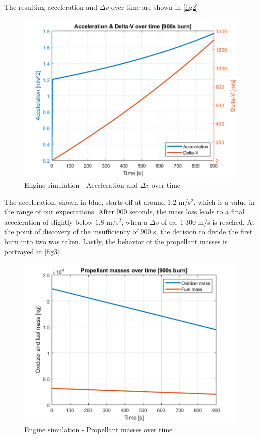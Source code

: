 The resulting acceleration and $\Delta v$ over time are shown in \autoref{fig2}.
\begin{figure}[H]
	\centering\includegraphics[width=0.9\linewidth]{accdeltav}
	\caption{Engine simulation - Acceleration and $\Delta v$ over time}\label{fig2}
\end{figure}

The acceleration, shown in blue, starts off at around $1.2$ m/s$^2$, which is a value in the range of our expectations. After $900$ seconds, the mass loss leads to a final acceleration of slightly below $1.8$ m/s$^2$, when a $\Delta v$ of ca. $1\ 300$ m/s is reached. At the point of discovery of the insufficiency of $900$ s, the decision to divide the first burn into two was taken. 
Lastly, the behavior of the propellant masses is portrayed in \autoref{fig3}. 

\begin{figure}[H]
	\centering\includegraphics[width=0.9\linewidth]{propmasstime}
	\caption{Engine simulation - Propellant masses over time}\label{fig3}
\end{figure}

